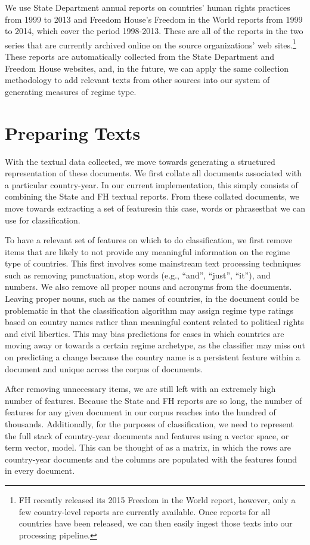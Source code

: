 \documentclass[pdftex,12pt,fullpage,oneside]{amsart}
\begin{document}
We use State Department annual reports on countries' human rights practices from 1999 to 2013 and Freedom House's Freedom in the World reports from 1999 to 2014, which cover the period 1998-2013. These are all of the reports in the two series that are currently archived online on the source organizations' web sites.\footnote{FH recently released its 2015 Freedom in the World report, however, only a few country-level reports are currently available. Once reports for all countries have been released, we can then easily ingest those texts into our processing pipeline.} These reports are automatically collected from the State Department and Freedom House websites, and, in the future, we can apply the same collection methodology to add relevant texts from other sources into our system of generating measures of regime type.

\section{Preparing Texts}

With the textual data collected, we move towards generating a structured representation of these documents. We first collate all documents associated with a particular country-year. In our current implementation, this simply consists of combining the State and FH textual reports. From these collated documents, we move towards extracting a set of features\textemdash in this case, words or phrases\textemdash that we can use for classification. 

To have a relevant set of features on which to do classification, we first remove items that are likely to not provide any meaningful information on the regime type of countries. This first involves some mainstream text processing techniques such as removing punctuation, stop words (e.g., ``and'', ``just'', ``it''), and numbers. We also remove all proper nouns and acronyms from the documents. Leaving proper nouns, such as the names of countries, in the document could be problematic in that the classification algorithm may assign regime type ratings based on country names rather than meaningful content related to political rights and civil liberties. This may bias predictions for cases in which countries are moving away or towards a certain regime archetype, as the classifier may miss out on predicting a change because the country name is a persistent feature within a document and unique across the corpus of documents.

After removing unnecessary items, we are still left with an extremely high number of features. Because the State and FH reports are so long, the number of features for any given document in our corpus reaches into the hundred of thousands. Additionally, for the purposes of classification, we need to represent the full stack of country-year documents and features using a vector space, or term vector, model. This can be thought of as a matrix, in which the rows are country-year documents and the columns are populated with the features found in every document. 
\end{document}
